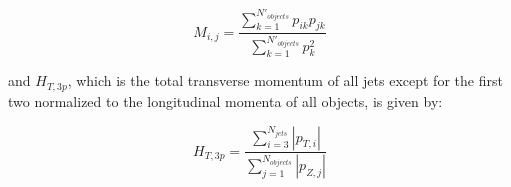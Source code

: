 \begin{equation}
  M_{i,j} = \frac{ \sum_{k=1}^{N'_{objects}} p_{ik}p_{jk} }{ \sum_{k=1}^{N'_{objects}} p_{k}^2 }
  \label{eq:Aplanarity}
\end{equation}

and $H_{T, 3p}$, which is the total transverse momentum of all jets except for the first two normalized to the longitudinal momenta of all objects, is given by:

\begin{equation}
  H_{T, 3p} = \frac{ \sum_{i=3}^{N_{jets}} |p_{T, i}| }{ \sum_{j=1}^{N_{objects}} |p_{Z,j}|  }
\end{equation}


\begin{figure}
  \begin{center}
\end{center}
\end{figure}
